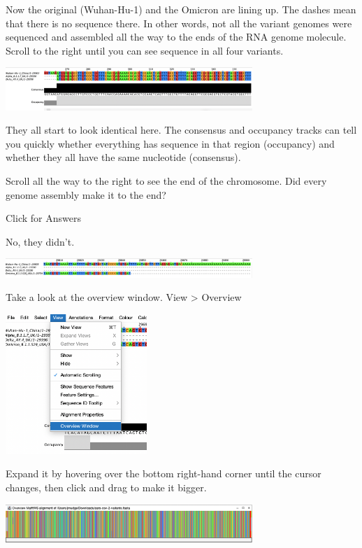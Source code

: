 \documentclass[
]{book}
\begin{document}
Now the original (Wuhan-Hu-1) and the Omicron are lining up. The dashes mean that there is no sequence there. In other words, not all the variant genomes were sequenced and assembled all the way to the ends of the RNA genome molecule. Scroll to the right until you can see sequence in all four variants.

\includegraphics[width=0.7\textwidth,height=\textheight]{./Figures/consensus.png}

They all start to look identical here. The consensus and occupancy tracks can tell you quickly whether everything has sequence in that region (occupancy) and whether they all have the same nucleotide (consensus).

Scroll all the way to the right to see the end of the chromosome. Did every genome assembly make it to the end?

Click for Answers

No, they didn't.

\includegraphics[width=0.7\textwidth,height=\textheight]{./Figures/chrend.png}

\hfill\break

Take a look at the overview window.
View \textgreater{} Overview

\includegraphics[width=0.4\textwidth,height=\textheight]{./Figures/overview.png}

Expand it by hovering over the bottom right-hand corner until the cursor changes, then click and drag to make it bigger.

\includegraphics[width=0.7\textwidth,height=\textheight]{./Figures/overview_window.png}
\end{document}
